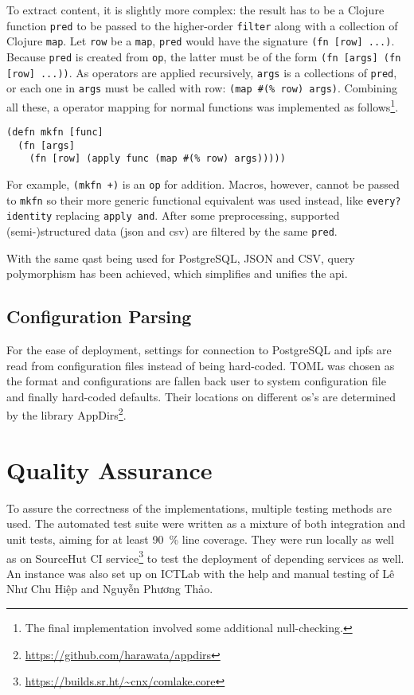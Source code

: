 To extract content, it is slightly more complex: the result has to be
a Clojure function \verb|pred| to be passed to the higher-order \verb|filter|
along with a collection of Clojure \verb|map|.  Let \verb|row| be
a \verb|map|, \verb|pred| would have the signature \verb|(fn [row] ...)|.
Because \verb|pred| is created from \verb|op|, the latter must be of the form
\verb|(fn [args] (fn [row] ...))|.  As operators are applied recursively,
\verb|args| is a collections of \verb|pred|, or each one in \verb|args|
must be called with row: \verb|(map #(% row) args)|.  Combining all these,
a operator mapping for normal functions was implemented as follows\footnote{The
final implementation involved some additional null-checking.}.
\begin{verbatim}
(defn mkfn [func]
  (fn [args]
    (fn [row] (apply func (map #(% row) args)))))
\end{verbatim}

For example, \verb|(mkfn +)| is an \verb|op| for addition.  Macros, however,
cannot be passed to \verb|mkfn| so their more generic functional equivalent
was used instead, like \verb|every? identity| replacing \verb|apply and|.
After some preprocessing, supported (semi-)structured data (\gls{json}
and \gls{csv}) are filtered by the same \verb|pred|.

With the same \gls{qast} being used for PostgreSQL, JSON and CSV,
query polymorphism has been achieved, which simplifies and unifies
the \gls{api}.

\subsection{Configuration Parsing}
For the ease of deployment, settings for connection to PostgreSQL
and \gls{ipfs} are read from configuration files instead of being hard-coded.
TOML was chosen as the format and configurations are fallen back
user to system configuration file and finally hard-coded defaults.
Their locations on different \gls{os}'s are determined by the library
AppDirs\footnote{\url{https://github.com/harawata/appdirs}}.

\section{Quality Assurance}
To assure the correctness of the implementations, multiple testing methods
are used.  The automated test suite were written as a mixture of
both integration and unit tests, aiming for at least \SI{90}{\percent}
line coverage.  They were run locally as well as on SourceHut CI
service\footnote{\url{https://builds.sr.ht/~cnx/comlake.core}}
to test the deployment of depending services as well.  An instance
was also set up on ICTLab with the help and manual testing
of {Lê Như Chu Hiệp and Nguyễn Phương Thảo}.
